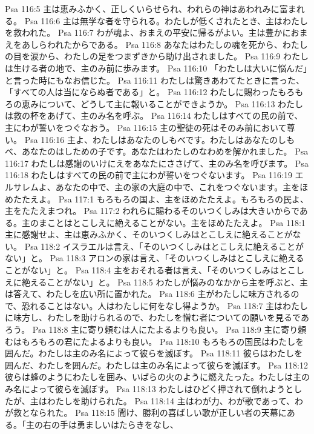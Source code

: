 Psa 116:5  主は恵みふかく、正しくいらせられ、われらの神はあわれみに富まれる。
Psa 116:6  主は無学な者を守られる。わたしが低くされたとき、主はわたしを救われた。
Psa 116:7  わが魂よ、おまえの平安に帰るがよい。主は豊かにおまえをあしらわれたからである。
Psa 116:8  あなたはわたしの魂を死から、わたしの目を涙から、わたしの足をつまずきから助け出されました。
Psa 116:9  わたしは生ける者の地で、主のみ前に歩みます。
Psa 116:10  「わたしは大いに悩んだ」と言った時にもなお信じた。
Psa 116:11  わたしは驚きあわてたときに言った、「すべての人は当にならぬ者である」と。
Psa 116:12  わたしに賜わったもろもろの恵みについて、どうして主に報いることができようか。
Psa 116:13  わたしは救の杯をあげて、主のみ名を呼ぶ。
Psa 116:14  わたしはすべての民の前で、主にわが誓いをつぐなおう。
Psa 116:15  主の聖徒の死はそのみ前において尊い。
Psa 116:16  主よ、わたしはあなたのしもべです。わたしはあなたのしもべ、あなたのはしための子です。あなたはわたしのなわめを解かれました。
Psa 116:17  わたしは感謝のいけにえをあなたにささげて、主のみ名を呼びます。
Psa 116:18  わたしはすべての民の前で主にわが誓いをつぐないます。
Psa 116:19  エルサレムよ、あなたの中で、主の家の大庭の中で、これをつぐないます。主をほめたたえよ。
Psa 117:1  もろもろの国よ、主をほめたたえよ。もろもろの民よ、主をたたえまつれ。
Psa 117:2  われらに賜わるそのいつくしみは大きいからである。主のまことはとこしえに絶えることがない。主をほめたたえよ。
Psa 118:1  主に感謝せよ、主は恵みふかく、そのいつくしみはとこしえに絶えることがない。
Psa 118:2  イスラエルは言え、「そのいつくしみはとこしえに絶えることがない」と。
Psa 118:3  アロンの家は言え、「そのいつくしみはとこしえに絶えることがない」と。
Psa 118:4  主をおそれる者は言え、「そのいつくしみはとこしえに絶えることがない」と。
Psa 118:5  わたしが悩みのなかから主を呼ぶと、主は答えて、わたしを広い所に置かれた。
Psa 118:6  主がわたしに味方されるので、恐れることはない。人はわたしに何をなし得ようか。
Psa 118:7  主はわたしに味方し、わたしを助けられるので、わたしを憎む者についての願いを見るであろう。
Psa 118:8  主に寄り頼むは人にたよるよりも良い。
Psa 118:9  主に寄り頼むはもろもろの君にたよるよりも良い。
Psa 118:10  もろもろの国民はわたしを囲んだ。わたしは主のみ名によって彼らを滅ぼす。
Psa 118:11  彼らはわたしを囲んだ、わたしを囲んだ。わたしは主のみ名によって彼らを滅ぼす。
Psa 118:12  彼らは蜂のようにわたしを囲み、いばらの火のように燃えたった。わたしは主のみ名によって彼らを滅ぼす。
Psa 118:13  わたしはひどく押されて倒れようとしたが、主はわたしを助けられた。
Psa 118:14  主はわが力、わが歌であって、わが救となられた。
Psa 118:15  聞け、勝利の喜ばしい歌が正しい者の天幕にある。「主の右の手は勇ましいはたらきをなし、

